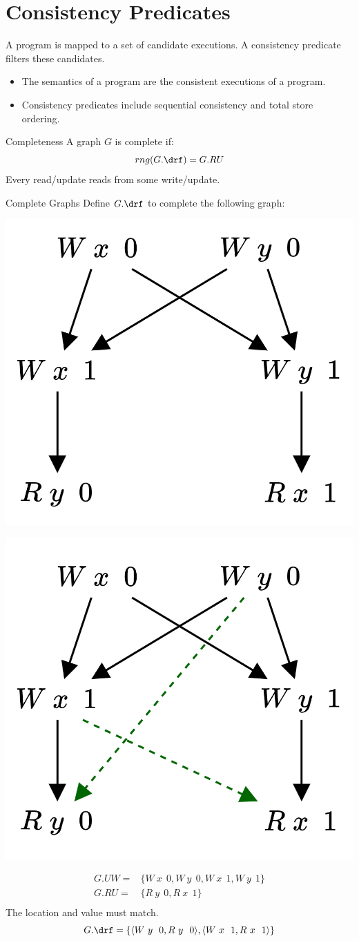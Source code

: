 \section{Consistency Predicates}
A program is mapped to a set of candidate executions. A consistency predicate filters these candidates.
\begin{itemize}
    \item The semantics of a program are the consistent executions of a program.
    \item Consistency predicates include sequential consistency and total store ordering.
\end{itemize}

\begin{definitionbox}{Completeness}
    A graph $G$ is complete if:
    \[rng(G.\drf) = G.RU\]
    Every read/update reads from some write/update. 
\end{definitionbox}
\begin{examplebox}{Complete Graphs}
    Define $G.\drf$ to complete the following graph:
    \begin{center}
        \includegraphics[width=.3\textwidth]{declarative_semantics/images/example_complete_graphs.drawio.png}
    \end{center}
    \tcblower
    \begin{center}
        \includegraphics[width=.3\textwidth]{declarative_semantics/images/example_complete_graphs_answer.drawio.png}
    \end{center}
    \[\begin{split}
        G.UW =&  \{W \ x \ \ 0, W \ y \ \ 0, W \ x \ \ 1, W \ y \ \ 1 \}\\
        G.RU = & \{R \ y \ \ 0, R \ x \ \ 1 \} \\
    \end{split}\]
    The location and value must match.
    \[G.\drf = \{\langle W \ y \ \ 0, R \ y \ \ 0 \rangle, \langle W \ x \ \ 1, R \ x \ \ 1\rangle\}\]
\end{examplebox}

